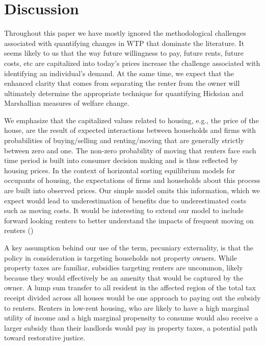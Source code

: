 \documentclass[ecta,nameyear,draft]{econsocart}
\theoremstyle{plain}
\theoremstyle{remark}
\begin{document}
 







\section{Discussion}
Throughout this paper we have mostly ignored the methodological challenges associated with quantifying changes in WTP that dominate the literature. It seems likely to us that the way future willingness to pay, future rents, future costs, etc are capitalized into today's prices increase the challenge associated with identifying an individual's demand. At the same time, we expect that the enhanced clarity that comes from separating the renter from the owner will ultimately determine the appropriate technique for quantifying Hicksian and Marshallian measures of welfare change.

We emphasize that the capitalized values related to housing, e.g., the price of the house, are the result of expected interactions between households and firms with probabilities of buying/selling and renting/moving that are generally strictly between zero and one. The non-zero probability of moving that renters face each time period is built into consumer decision making and is thus reflected by housing prices. In the context of horizontal sorting equilibrium models for occupants of housing, the expectations of firms and households about this process are built into observed prices. Our simple model omits this information, which we expect would lead to underestimation of benefits due to underestimated costs such as moving costs. It would be interesting to extend our model to include forward looking renters to better understand the impacts of frequent moving on renters (\cite{bishop19}) 

A key assumption behind our use of the term, pecuniary externality, is that the policy in consideration is targeting households not property owners. While property taxes are familiar, subsidies targeting renters are uncommon, likely because they would effectively be an amenity that would be captured by the owner. A lump sum transfer to all resident in the affected region of the total tax receipt divided across all houses would be one approach to paying out the subsidy to renters. Renters in low-rent housing, who are likely to have a high marginal utility of income and a high marginal propensity to consume would also receive a larger subsidy than their landlords would pay in property taxes, a potential path toward restorative justice. 
\end{document}

